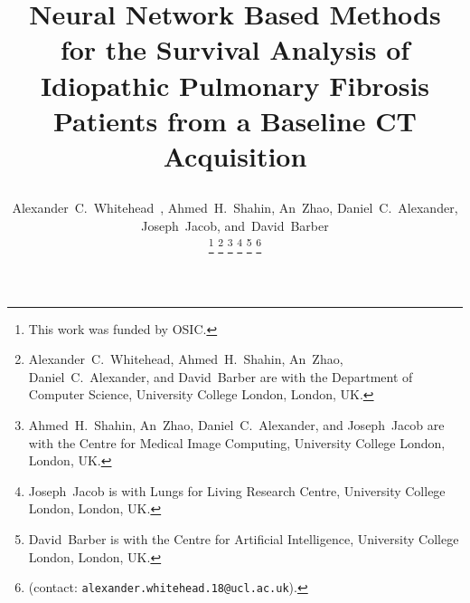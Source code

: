 \documentclass{IEEEtran}
\begin{document}
    \title{
        \vspace{-0.75cm}
        
        Neural Network Based Methods for the Survival Analysis of Idiopathic Pulmonary Fibrosis Patients from a Baseline CT Acquisition
    }
    
    \author{
        \vspace{-0.25cm}

        Alexander~C.~Whitehead~,
        Ahmed~H.~Shahin,
        An~Zhao,
        Daniel~C.~Alexander,
        Joseph~Jacob,
        and~David~Barber
    
        \vspace{-0.75cm}

        \thanks{
            \scriptsize
            This work was funded by \gls{OSIC}.
        }
        \thanks{
            \scriptsize
            Alexander~C.~Whitehead, Ahmed~H.~Shahin, An~Zhao, Daniel~C.~Alexander, and David~Barber are with the Department of Computer Science, University College London, London, UK.
        }
        \thanks{
            \scriptsize
            Ahmed~H.~Shahin, An~Zhao, Daniel~C.~Alexander, and Joseph~Jacob are with the Centre for Medical Image Computing, University College London, London, UK.
        }
        \thanks{
            \scriptsize
            Joseph~Jacob is with Lungs for Living Research Centre, University College London, London, UK.
        }
        \thanks{
            \scriptsize
            David~Barber is with the Centre for Artificial Intelligence, University College London, London, UK.
        }
        \thanks{
            \scriptsize
            (contact: \texttt{alexander.whitehead.18@ucl.ac.uk}).
        }
    }
    
    \pagestyle{plain}
    
    \maketitle
    
\end{document}
